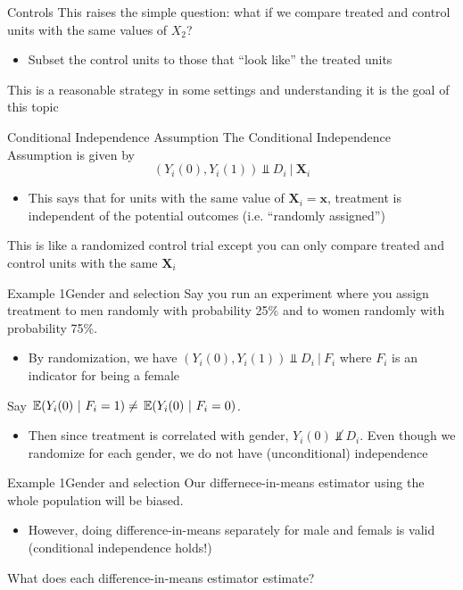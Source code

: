 \documentclass[aspectratio=169,t,11pt,table]{beamer}
\begin{document}
\begin{frame}{Controls}
  This raises the simple question: what if we compare treated and control units with the same values of $X_2$?
  \begin{itemize}
    \item Subset the control units to those that ``look like'' the treated units
  \end{itemize}

  \pause
  \bigskip
  This is a reasonable strategy in some settings and understanding it is the goal of this topic
\end{frame}

\begin{frame}{Conditional Independence Assumption}
  The \alert{Conditional Independence Assumption} is given by
  $$
    (Y_{i}(0), Y_{i}(1)) \Perp D_i \ \vert \ \bm{X}_i
  $$
  \begin{itemize}
    \item This says that for units with the same value of $\bm{X}_i = \bm{x}$, treatment is independent of the potential outcomes (i.e. ``randomly assigned'')
  \end{itemize}

  \pause
  \bigskip
  This is like a randomized control trial except you can only compare treated and control units with the same $\bm{X}_i$
\end{frame}

\begin{frame}{Example 1}{Gender and selection}
  Say you run an experiment where you assign treatment to men randomly with probability 25\% and to women randomly with probability 75\%. 
  \begin{itemize}
    \item By randomization, we have $ (Y_{i}(0), Y_{i}(1)) \Perp D_i \ \vert \ F_i$ where $F_i$ is an indicator for being a female
  \end{itemize}

  \pause
  \bigskip
  Say $\expec{Y_i(0)}{F_i = 1} \neq \expec{Y_i(0)}{F_i = 0}$. 
  \begin{itemize}
    \item Then since treatment is correlated with gender, $Y_{i}(0) \not\Perp D_i$. Even though we randomize for each gender, we do not have (unconditional) independence
  \end{itemize}
\end{frame}

\begin{frame}{Example 1}{Gender and selection}
  Our differnece-in-means estimator using the whole population will be biased.
  \begin{itemize}
    \item However, doing difference-in-means separately for male and femals is valid (conditional independence holds!)
  \end{itemize}

  \bigskip
  What does each difference-in-means estimator estimate?
\end{frame}
\end{document}
